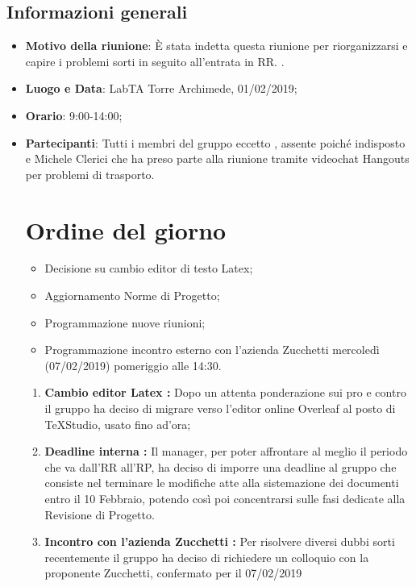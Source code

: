 \documentclass[12pt]{article}
\begin{document}
    \subsection{Informazioni generali}
    \begin{itemize}
        \item \textbf{Motivo della riunione}: È stata indetta questa riunione per riorganizzarsi e capire i problemi sorti in seguito all'entrata in RR.   \pedice.
        \item \textbf{Luogo e Data}: LabTA Torre Archimede, 01/02/2019;
        \item \textbf{Orario}: 9:00-14:00;
        \item \textbf{Partecipanti}: Tutti i membri del gruppo eccetto \daG, assente poiché indisposto e Michele Clerici che ha preso parte alla riunione tramite videochat Hangouts per problemi di trasporto.
        \newpage
        \section{Ordine del giorno}
        \begin{itemize}
        \item Decisione su cambio editor di testo Latex;
        \item Aggiornamento Norme di Progetto;
        \item Programmazione nuove riunioni;
        \item Programmazione incontro esterno con l'azienda Zucchetti mercoledì (07/02/2019) pomeriggio alle 14:30.
        \end{itemize}
        
        \newpage
    \begin{enumerate}
\section{Risultati}
    \subsection{Ordine del giorno}
        \item \textbf{Cambio editor Latex :} Dopo un attenta ponderazione sui pro e contro il gruppo ha deciso di migrare verso l'editor online Overleaf al posto di TeXStudio, usato fino ad'ora;
        \item \textbf{Deadline interna :} Il manager, per poter affrontare al meglio il periodo che va dall'RR all'RP, ha deciso di imporre una deadline al gruppo che consiste nel terminare le modifiche atte alla sistemazione dei documenti entro il 10 Febbraio, potendo così poi concentrarsi sulle fasi dedicate alla Revisione di Progetto.
        \item \textbf{Incontro con l'azienda Zucchetti :} Per risolvere diversi dubbi sorti recentemente il gruppo ha deciso di richiedere un colloquio con la proponente Zucchetti, confermato per il 07/02/2019
    \end{enumerate}

\end{itemize}
\end{document}
